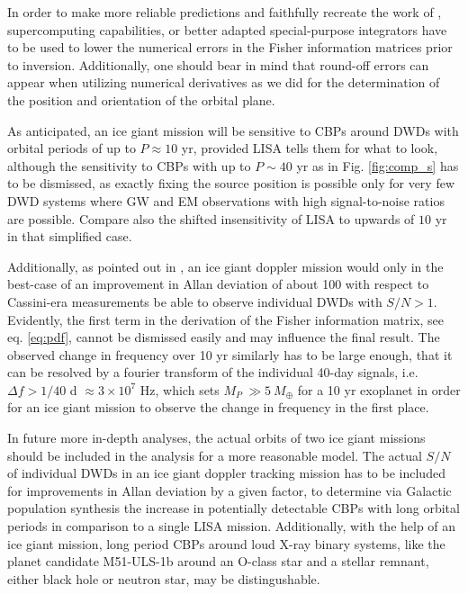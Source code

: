 \documentclass{aa}
\begin{document}
In order to make more reliable predictions and faithfully recreate the work of \citep{tamanini}, supercomputing capabilities, or better adapted special-purpose integrators have to be used to lower the numerical errors in the Fisher information matrices prior to inversion. Additionally, one should bear in mind that round-off errors can appear when utilizing numerical derivatives as we did for the determination of the position and orientation of the orbital plane. 

As anticipated, an ice giant mission will be  sensitive to CBPs around DWDs with orbital periods of up to $P\approx 10$ yr, provided LISA tells them for what to look, although the sensitivity to CBPs with up to $P\sim 40$ yr as in Fig. \ref{fig:comp_s} has to be dismissed, as exactly fixing the source position is possible only for very few DWD systems where GW and EM observations with high signal-to-noise ratios are possible. Compare also the shifted insensitivity of LISA to upwards of $10$ yr in that simplified case.

Additionally, as pointed out in \citep{soyuer2021}, an ice giant doppler mission would only in the best-case of an improvement in Allan deviation of about 100 with respect to Cassini-era measurements be able to observe individual DWDs with $S/N > 1$. Evidently, the first term in the derivation of the Fisher information matrix, see eq. \ref{eq:pdf}, cannot be dismissed easily and may influence the final result. The observed change in frequency over 10 yr similarly has to be large enough, that it can be resolved by a fourier transform of the individual 40-day signals, i.e. $\Delta f > 1/40$ d $\approx 3\times 10^7$ Hz, which sets $M_P\ \gg 5\ M_\oplus$ for a 10 yr exoplanet in order for an ice giant mission to observe the change in frequency in the first place.

In future more in-depth analyses, the actual orbits of two ice giant missions should be included in the analysis for a more reasonable model. The actual $S/N$ of individual DWDs in an ice giant doppler tracking mission has to be included for improvements in Allan deviation by a given factor, to determine via Galactic population synthesis the increase in potentially detectable CBPs with long orbital periods in comparison to a single LISA mission. Additionally, with the help of an ice giant mission, long period CBPs around loud X-ray binary systems, like the planet candidate M51-ULS-1b \citep{X_ray_binary} around an O-class star and a stellar remnant, either black hole or neutron star, may be distingushable.
\end{document}
